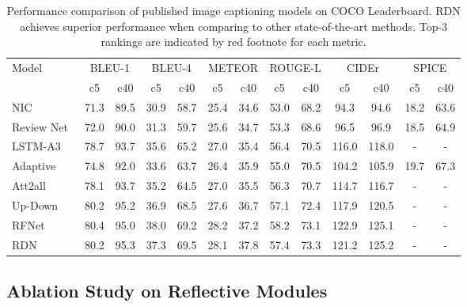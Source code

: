 \documentclass[10pt,twocolumn,letterpaper]{article}
\begin{document}
\begin{table*}[t]
	\centering
	\tabcolsep=0.15cm
	\renewcommand{\arraystretch}{0.9}
	{\small
		\begin{tabular}{ l | c | c | c | c | c | c | c | c | c | c | c | c }
			\toprule
			\multirow{2}{*}{Model} &
			\multicolumn{2}{c|}{BLEU-1} &
			\multicolumn{2}{c|}{BLEU-4} &
			\multicolumn{2}{c|}{METEOR} &
			\multicolumn{2}{c|}{ROUGE-L} &
			\multicolumn{2}{c|}{CIDEr} &
			\multicolumn{2}{c}{SPICE} \\
			\cline{2-13}
			& c5 & c40 & c5 & c40 & c5 & c40 & c5 & c40 & c5 & c40 & c5 & c40 \\
			\hline
			NIC \cite{vinyals2015showtell}  & 71.3 & 89.5 & 30.9 & 58.7 & 25.4 & 34.6 & 53.0 & 68.2  & 94.3 & 94.6 & 18.2 & 63.6 \\
Review Net~\cite{yang2016review}  & 72.0 & 90.0 & 31.3 & 59.7 & 25.6 & 34.7 & 53.3 & 68.6  & 96.5 & 96.9 & 18.5 & 64.9 \\
			LSTM-A3~\cite{yao2017boosting}  & 78.7 & 93.7 & 35.6 & 65.2 & 27.0 & 35.4 & 56.4 & 70.5  & 116.0 & 118.0 & - & - \\
			Adaptive~\cite{lu2017knowing}  & 74.8 & 92.0 & 33.6 & 63.7 & 26.4 & 35.9 & 55.0 & 70.5  & 104.2 & 105.9 & 19.7 & 67.3 \\
			Att2all~\cite{rennie2017self}  & 78.1 & 93.7 & 35.2 & 64.5 & 27.0 & 35.5 & 56.3 & 70.7  & 114.7 & 116.7 & - & - \\
			Up-Down~\cite{anderson2017bottom}  & 80.2 & 95.2 & 36.9 & 68.5 & 27.6 & 36.7 & 57.1 & 72.4  & 117.9 & 120.5 & - & - \\
			RFNet~\cite{jiang2018recurrent}  & 80.4 & 95.0 & 38.0 & 69.2 & 28.2 & 37.2 & 58.2 & 73.1  & 122.9 & 125.1 & - & - \\
			\midrule
			RDN & 80.2 & 95.3 & 37.3 & 69.5 & 28.1 & 37.8 & 57.4 & 73.3  & 121.2 & 125.2 & - & - \\
			\bottomrule
		\end{tabular}
	}
	\vspace{0.1cm}
	\caption{Performance comparison of published image captioning models on COCO Leaderboard. RDN achieves superior performance when comparing to other state-of-the-art methods. Top-3 rankings are indicated by red footnote for each metric.}
	\label{table:leaderboard}
	\vspace{-0.2in}
\end{table*}

\subsection{Ablation Study on Reflective Modules}
\end{document}
